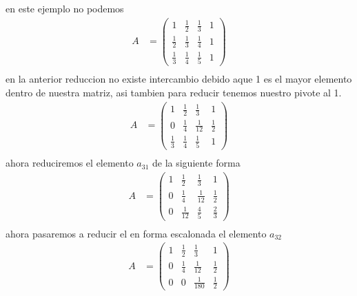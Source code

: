 \begin{enumerate}
en este ejemplo no podemos
\begin{align*}
A &=
\left(\begin{array}{ccc|c}  
  1          &\frac{1}{2} & \frac{1}{3} & 1 \\[6pt]  
  \frac{1}{2}&\frac{1}{3} & \frac{1}{4} & 1 \\[6pt] 
  \frac{1}{3}&\frac{1}{4} & \frac{1}{5} & 1  
\end{array}\right)\\
\end{align*}
en la anterior reduccion no existe intercambio debido aque 1 es el mayor elemento dentro de nuestra matriz, asi tambien para reducir tenemos nuestro pivote al 1.
\begin{align*}
A &=
\left(\begin{array}{ccc|c}  
  1          &\frac{1}{2} & \frac{1}{3} & 1 \\[6pt]  
  0     &\frac{1}{4} & \frac{1}{12} & \frac{1}{2} \\[6pt] 
  \frac{1}{3}&\frac{1}{4} & \frac{1}{5} & 1  
\end{array}\right)\\
\end{align*}
ahora reduciremos el elemento $a_{31}$ de la siguiente forma
\begin{align*}
A &=
\left(\begin{array}{ccc|c}  
  1          &\frac{1}{2} & \frac{1}{3} & 1 \\[6pt]  
  0     &\frac{1}{4} & \frac{1}{12} & \frac{1}{2} \\[6pt] 
  0     &\frac{1}{12} & \frac{4}{5} & \frac{2}{3}  
\end{array}\right)\\
\end{align*}
ahora pasaremos a reducir el en forma escalonada el elemento $a_{32}$
\begin{align*}
A &=
\left(\begin{array}{ccc|c}  
  1          &\frac{1}{2} & \frac{1}{3} & 1 \\[6pt]  
  0     &\frac{1}{4} & \frac{1}{12} & \frac{1}{2} \\[6pt] 
  0     &0 & \frac{1}{180} & \frac{1}{2}  
\end{array}\right)\\
\end{align*}


\end{enumerate}
